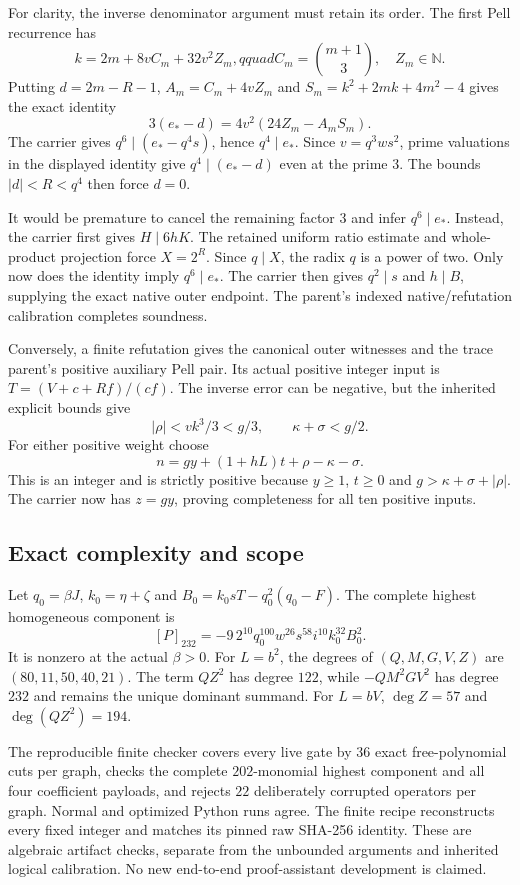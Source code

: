 For clarity, the inverse denominator argument must retain its order.
The first Pell recurrence has
\[
 k=2m+8vC_m+32v^2Z_m,qquad
 C_m=\binom{m+1}{3},\quad Z_m\in\mathbb N.
\]
Putting $d=2m-R-1$, $A_m=C_m+4vZ_m$ and
$S_m=k^2+2mk+4m^2-4$ gives the exact identity
\[
 3(e_*-d)=4v^2(24Z_m-A_mS_m).
\]
The carrier gives $q^6\mid(e_*-q^4s)$, hence $q^4\mid e_*$.
Since $v=q^3ws^2$, prime valuations in the displayed identity give
$q^4\mid(e_*-d)$ even at the prime $3$.
The bounds $|d|<R<q^4$ then force $d=0$.

It would be premature to cancel the remaining factor $3$ and infer
$q^6\mid e_*$.  Instead, the carrier first gives $H\mid6hK$.
The retained uniform ratio estimate and whole-product projection force
$X=2^R$.  Since $q\mid X$, the radix $q$ is a power of two.  Only now
does the identity imply $q^6\mid e_*$.  The carrier then gives
$q^2\mid s$ and $h\mid B$, supplying the exact native outer endpoint.
The parent's indexed native/refutation calibration completes soundness.

Conversely, a finite refutation gives the canonical outer witnesses and
the trace parent's positive auxiliary Pell pair.  Its actual positive
integer input is $T=(V+c+Rf)/(cf)$.
The inverse error can be negative, but the inherited explicit bounds give
\[
 |\rho|<vk^3/3<g/3,\qquad \kappa+\sigma<g/2.
\]
For either positive weight choose
\[
 n=gy+(1+hL)t+\rho-\kappa-\sigma.
\]
This is an integer and is strictly positive because $y\ge1$, $t\ge0$
and $g>\kappa+\sigma+|\rho|$.  The carrier now has $z=gy$, proving
completeness for all ten positive inputs.

\subsection{Exact complexity and scope}

Let $q_0=\beta J$, $k_0=\eta+\zeta$ and
$B_0=k_0sT-q_0^2(q_0-F)$.  The complete highest homogeneous component is
\[
 [P]_{232}=-9\,2^{10}q_0^{100}w^{26}s^{58}i^{10}k_0^{32}B_0^2.
\]
It is nonzero at the actual $\beta>0$.
For $L=b^2$, the degrees of $(Q,M,G,V,Z)$ are
$(80,11,50,40,21)$.  The term $QZ^2$ has degree $122$, while
$-QM^2GV^2$ has degree $232$ and remains the unique dominant summand.
For $L=bV$, $\deg Z=57$ and $\deg(QZ^2)=194$.

The reproducible finite checker covers every live gate by $36$ exact
free-polynomial cuts per graph, checks the complete $202$-monomial highest
component and all four coefficient payloads, and rejects $22$ deliberately
corrupted operators per graph.  Normal and optimized Python runs agree.
The finite recipe reconstructs every fixed integer and matches its pinned
raw SHA-256 identity.  These are algebraic artifact checks, separate from
the unbounded arguments and inherited logical calibration.
No new end-to-end proof-assistant development is claimed.
